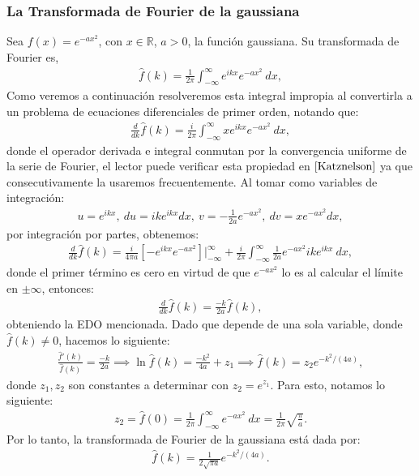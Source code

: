 \documentclass[12pt]{article}
\theoremstyle{definition}
\newcommand*{\field}[1]{\mathbb{#1}}
\begin{document}
\subsubsection{La Transformada de Fourier de la gaussiana}
\noindent
Sea $f(x) = e^{-ax^2}$, con $x\in\field{R}$, $a>0$, la función gaussiana. Su transformada de Fourier es, 
\begin{align*}
    \hat{f}(k) = \frac{1}{2\pi}\int_{-\infty}^{\infty}e^{ikx}e^{-ax^2}\:dx,
\end{align*}
Como veremos a continuación
resolveremos esta integral impropia al convertirla a un problema de ecuaciones diferenciales de primer orden, notando que:
\begin{align*}
    \frac{d}{dk} \hat{f}(k) = \frac{i}{2\pi}\int_{-\infty}^{\infty}xe^{ikx}e^{-ax^2}\:dx,
\end{align*}
donde el operador derivada e integral conmutan por la convergencia uniforme de la serie de Fourier, el lector puede verificar esta propiedad en $\cite{Katznelson}$ ya que consecutivamente la usaremos frecuentemente. Al tomar como variables de integración:
\begin{align*}
    u=e^{ikx},\: du=ike^{ikx}dx,\:v=-\frac{1}{2a}e^{-ax^2},\:dv = xe^{-ax^2}dx,
\end{align*}
 por integración por partes, obtenemos:
\begin{align*}
    \frac{d}{dk} \hat{f}(k) = \frac{i}{4\pi a}[-e^{ikx}e^{-ax^2}]\Big|_{-\infty}^{\infty} +\frac{i}{2\pi}\int_{-\infty}^{\infty}\frac{1}{2a}e^{-ax^2}ike^{ikx}\:dx,
\end{align*}
donde el primer término es cero en virtud de que $e^{-ax^2}$ lo es al calcular el límite en $\pm\infty$, entonces:
\begin{align*}
    \frac{d}{dk} \hat{f}(k) = \frac{-k}{2a} \hat{f}(k),
\end{align*}
obteniendo la EDO mencionada. Dado que depende de una sola variable, donde $\hat{f}(k)\neq 0$, hacemos lo siguiente:
\begin{align*}
     \frac{\hat{f}'(k)}{ \hat{f}(k)} = \frac{-k}{2a} \implies
    \ln{\hat{f}(k)} = \frac{-k^2}{4a}+z_{1} \implies  \hat{f}(k) = z_{2}e^{-k^2/(4a)},
\end{align*}
donde $z_{1},z_{2}$ son constantes a determinar con $z_{2} = e^{z_{1}}$. Para esto, notamos lo siguiente:
\begin{align*}
    z_{2}= \hat{f}(0) = \frac{1}{2\pi}\int_{-\infty}^{\infty}e^{-ax^2}\:dx = \frac{1}{2\pi}\sqrt{\frac{\pi}{a}}.
\end{align*}
Por lo tanto, la transformada de Fourier de la gaussiana está dada por:
\begin{align}
     \hat{f}(k) = \frac{1}{2\sqrt{\pi a}}e^{-k^2/(4a)}.
     \label{eq:TraGauss}
\end{align}
\end{document}
